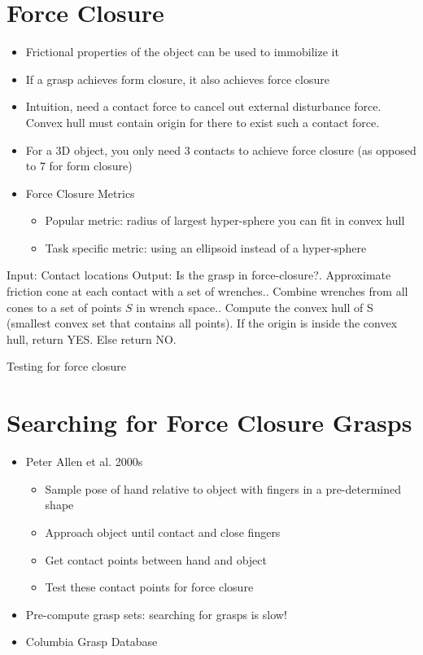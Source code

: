 \documentclass[../main.tex]{subfiles}
\begin{document}
    \section{Force Closure}
    \begin{itemize}
        \item Frictional properties of the object can be used to immobilize it
        \item If a grasp achieves form closure, it also achieves force closure
        \item Intuition, need a contact force to cancel out external disturbance force. Convex hull must contain origin for there to exist such a contact force.
        \item For a 3D object, you only need 3 contacts to achieve force closure (as opposed to 7 for form closure)
        \item Force Closure Metrics
        \begin{itemize}
            \item Popular metric: radius of largest hyper-sphere you can fit in convex hull
            \item Task specific metric: using an ellipsoid instead of a hyper-sphere
        \end{itemize}
    \end{itemize}

    \begin{algorithm}[H]
        \SetAlgoLined
        Input: Contact locations\;
        Output: Is the grasp in force-closure?. Approximate friction cone at each contact with a set of wrenches.. Combine wrenches from all cones to a set of points $S$ in wrench space.. Compute the convex hull of S (smallest convex set that contains all points). If the origin is inside the convex hull, return YES. Else return NO.\;
        \caption{Testing for force closure}
    \end{algorithm}
    \section{Searching for Force Closure Grasps}
    \begin{itemize}
        \item Peter Allen et al. 2000s
        \begin{itemize}
            \item Sample pose of hand relative to object with fingers in a pre-determined shape
            \item Approach object until contact and close fingers
            \item Get contact points between hand and object
            \item Test these contact points for force closure
        \end{itemize}
        \item Pre-compute grasp sets: searching for grasps is slow!
        \item Columbia Grasp Database
    \end{itemize}
\end{document}
